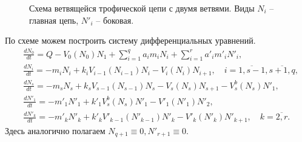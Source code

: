 \begin{figure}[H]
    \caption{Схема ветвящейся трофической цепи с двумя ветвями. Виды \(N_i\) -- главная цепь, \(N'_i\) -- боковая.} \label{schema_split}
\end{figure}

По схеме можем построить систему дифференциальных уравнений.
\begin{equation} \label{double_full}
    \begin{split}
        & \frac{d N_0}{dt} = Q - V_0(N_0) N_1 + \sum_{i=1}^q a_i m_i N_i + \sum_{i=1}^r a'_i m'_i N'_i, \\
        & \frac{d N_i}{dt} = -m_i N_i + k_i V_{i-1}(N_{i-1}) N_i - V_i(N_i) N_{i+1}, \quad i=\overline{1,s-1},  \overline{s+1,q}, \\
        & \frac{d N_s}{dt} = -m_s N_s + k_s V_{s-1}(N_{s-1}) N_s - V_s(N_s) N_{s+1} - V_s^b(N_s) N'_1, \\
        & \frac{d N'_1}{dt} = -m'_1 N'_1 + k'_1 V_s^b(N_s) N'_1 - V'_1(N'_1) N'_{2}, \\
        & \frac{d N'_k}{dt} = -m'_k N'_k + k'_k V'_{k-1}(N'_{k-1}) N'_k - V'_k(N'_k) N'_{k+1}, \quad k=\overline{2,r}.
    \end{split}
\end{equation} 
Здесь аналогично полагаем \(N_{q+1} \equiv 0, N'_{r+1} \equiv 0\).